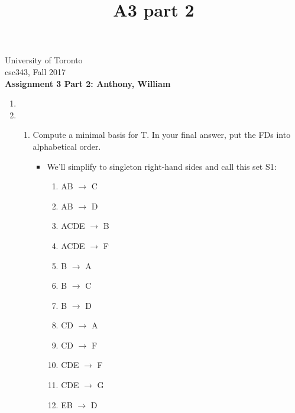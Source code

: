 \documentclass{article}
\title{A3 part 2}
\begin{document}
\noindent
University of Toronto\\
{\sc csc}343, Fall 2017\\[10pt]
{\LARGE\bf Assignment 3 Part 2: Anthony, William} \\[10pt]

\renewcommand{\labelenumiii}{\arabic{enumiii}}
\begin{enumerate}

\item %

\item %
\begin{enumerate} [leftmargin=0pt, itemindent=*]
\item %
Compute a minimal basis for T. In your final answer, put the FDs into alphabetical order.
\begin{itemize}

\item %
We'll simplify to singleton right-hand sides and call this set S1:
\begin{enumerate} 
\item AB $\rightarrow$ C
\item AB $\rightarrow$ D
\item ACDE $\rightarrow$ B
\item ACDE $\rightarrow$ F
\item B $\rightarrow$ A
\item B $\rightarrow$ C
\item B $\rightarrow$ D
\item CD $\rightarrow$ A
\item CD $\rightarrow$ F
\item CDE $\rightarrow$ F
\item CDE $\rightarrow$ G
\item EB $\rightarrow$ D
\end{enumerate}


\end{itemize}
\end{enumerate}
\end{enumerate}
\end{document}

